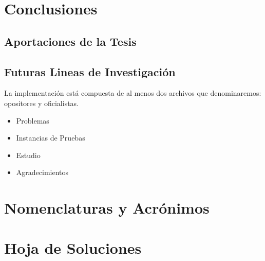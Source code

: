 \documentclass[12pt, runningheads,a4]{book}
\begin{document}



\chapter{Conclusiones} \label{cap.6}
\section{Aportaciones de la Tesis}

\section{Futuras Lineas de Investigación }
La implementación está compuesta de al menos dos archivos que denominaremos: opositores y oficialistas.

\begin{itemize}
	\item Problemas 
	\item Instancias de Pruebas
	\item Estudio
	\item Agradecimientos	
\end{itemize}

\thispagestyle{empty}

\newpage

\renewcommand{\appendixname}{Anexo}
\renewcommand{\appendixtocname}{Anexos}
\renewcommand{\appendixpagename}{Anexos}

\appendix
\clearpage
\addappheadtotoc
\appendixpage 

\chapter{Nomenclaturas y Acrónimos} \label{cap.nomencla}
\chapter{Hoja de Soluciones}\label{cap.hoja}


\listoffigures 	%
\listoftables 	%


\backmatter
\newpage
\begin{center}
\thispagestyle{empty}
\nocite{*}


\end{center} 
\end{document}
